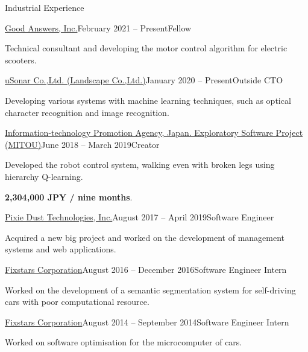 \documentclass{resume} %
\begin{document}
\begin{rSection}{Industrial Experience}

    \begin{rSubsection}{\href{https://info.gbiz.go.jp/hojin/ichiran?hojinBango=2430001082637}{Good Answers, Inc.}}{February 2021 -- Present}{Fellow}{}
    \item Technical consultant and developing the motor control algorithm for electric scooters.
    \end{rSubsection}

    \begin{rSubsection}{\href{https://www.landscape.co.jp/}{uSonar Co.,Ltd. (Landscape Co.,Ltd.)}}{January 2020 -- Present}{Outside CTO}{}
    \item Developing various systems with machine learning techniques, such as optical character recognition and image recognition.
    \end{rSubsection}

    \begin{rSubsection}{\href{https://www.mitou.org/}{Information-technology Promotion Agency, Japan. Exploratory Software Project (MITOU)}}{June 2018 -- March 2019}{Creator}{}
    \item Developed the robot control system, walking even with broken legs using hierarchy Q-learning.
    \item \textbf{2,304,000 JPY / nine months}.
    \end{rSubsection}

    \begin{rSubsection}{\href{http://pixiedusttech.com/}{Pixie Dust Technologies, Inc.}}{August 2017 -- April 2019}{Software Engineer}{}
    \item Acquired a new big project and worked on the development of management systems and web applications.
    \end{rSubsection}

    \begin{rSubsection}{\href{https://www.fixstars.com/en/}{Fixstars Corporation}}{August 2016 -- December 2016}{Software Engineer Intern}{}
    \item Worked on the development of a semantic segmentation system for self-driving cars with poor computational resource.
    \end{rSubsection}

    \begin{rSubsection}{\href{https://www.fixstars.com/en/}{Fixstars Corporation}}{August 2014 -- September 2014}{Software Engineer Intern}{}
    \item Worked on software optimisation for the microcomputer of cars.
    \end{rSubsection}

\end{rSection}
\end{document}
